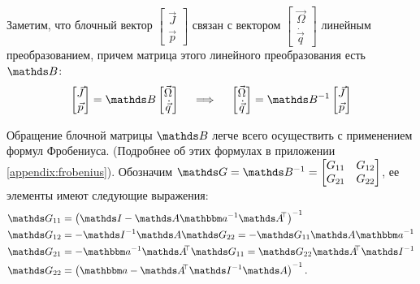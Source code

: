 Заметим, что блочный вектор $\begin{bmatrix} \vec{J} \\ \vec{p} \end{bmatrix}$ связан с вектором $\begin{bmatrix} \vec{\Omega} \\ \dot{\vec{q}} \end{bmatrix}$ линейным преобразованием, причем матрица этого линейного преобразования есть $\bbB$:
\vverh
\begin{gather}
\begin{bmatrix}
\vec{J} \\
\vec{p}
\end{bmatrix}
= \bbB
\begin{bmatrix}
\vec{\Omega} \\
\dot{\vec{q}}
\end{bmatrix}
\quad \implies \quad 
\begin{bmatrix}
\vec{\Omega} \\
\dot{\vec{q}}
\end{bmatrix}
= \bbB^{-1}
\begin{bmatrix}
\vec{J} \\
\vec{p}
\end{bmatrix} \notag
\end{gather}

Обращение блочной матрицы $\bbB$ легче всего осуществить с применением формул Фробениуса. (Подробнее об этих формулах в приложении \ref{appendix:frobenius}).
Обозначим $\bbG = \bbB^{-1} = \begin{bmatrix} G_{11} & G_{12} \\ G_{21} & G_{22}
\end{bmatrix}$, ее элементы имеют следующие выражения:
\vverh
\begin{gather}
\begin{aligned}
\bbG_{11} &=  \lb \bbI - \bbA \bba^{-1} \bbA^{\dn \top} \rb^{-1} \\
\bbG_{12} &= - \bbI^{-1} \bbA \bbG_{22} = - \bbG_{11} \bbA \bba^{-1}\\
\bbG_{21} &= - \bba^{-1} \bbA^{\dn \top} \bbG_{11} = \bbG_{22} \bbA^{\dn \top} \bbI^{-1} \\
\bbG_{22} &= \lb \bba - \bbA^{\dn \top} \bbI^{-1} \bbA \rb^{-1}.
\end{aligned}
\notag
\end{gather}


